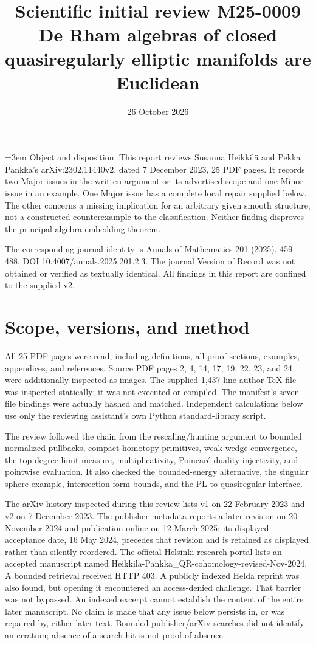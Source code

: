 \documentclass[10pt]{article}
\title{Scientific initial review M25-0009
De Rham algebras of closed quasiregularly elliptic manifolds are Euclidean}
\author{}
\date{26 October 2026}
\begin{document}
\maketitle
=3em Object and disposition. This report reviews Susanna Heikkilä and Pekka Pankka’s arXiv:2302.11440v2, dated 7 December 2023, 25 PDF pages. It records two Major issues in the written argument or its advertised scope and one Minor issue in an example. One Major issue has a complete local repair supplied below. The other concerns a missing implication for an arbitrary given smooth structure, not a constructed counterexample to the classification. Neither finding disproves the principal algebra-embedding theorem.\par
The corresponding journal identity is Annals of Mathematics 201 (2025), 459–488, DOI 10.4007/annals.2025.201.2.3. The journal Version of Record was not obtained or verified as textually identical. All findings in this report are confined to the supplied v2.\par
\section*{Scope, versions, and method}
All 25 PDF pages were read, including definitions, all proof sections, examples, appendices, and references. Source PDF pages 2, 4, 14, 17, 19, 22, 23, and 24 were additionally inspected as images. The supplied 1,437-line author TeX file was inspected statically; it was not executed or compiled. The manifest’s seven file bindings were actually hashed and matched. Independent calculations below use only the reviewing assistant’s own Python standard-library script.\par
The review followed the chain from the rescaling/hunting argument to bounded normalized pullbacks, compact homotopy primitives, weak wedge convergence, the top-degree limit measure, multiplicativity, Poincaré-duality injectivity, and pointwise evaluation. It also checked the bounded-energy alternative, the singular sphere example, intersection-form bounds, and the PL-to-quasiregular interface.\par
The arXiv history inspected during this review lists v1 on 22 February 2023 and v2 on 7 December 2023. The publisher metadata reports a later revision on 20 November 2024 and publication online on 12 March 2025; its displayed acceptance date, 16 May 2024, precedes that revision and is retained as displayed rather than silently reordered. The official Helsinki research portal lists an accepted manuscript named Heikkila-Pankka\_QR-cohomology-revised-Nov-2024. A bounded retrieval received HTTP 403. A publicly indexed Helda reprint was also found, but opening it encountered an access-denied challenge. That barrier was not bypassed. An indexed excerpt cannot establish the content of the entire later manuscript. No claim is made that any issue below persists in, or was repaired by, either later text. Bounded publisher/arXiv searches did not identify an erratum; absence of a search hit is not proof of absence.\par
\end{document}
